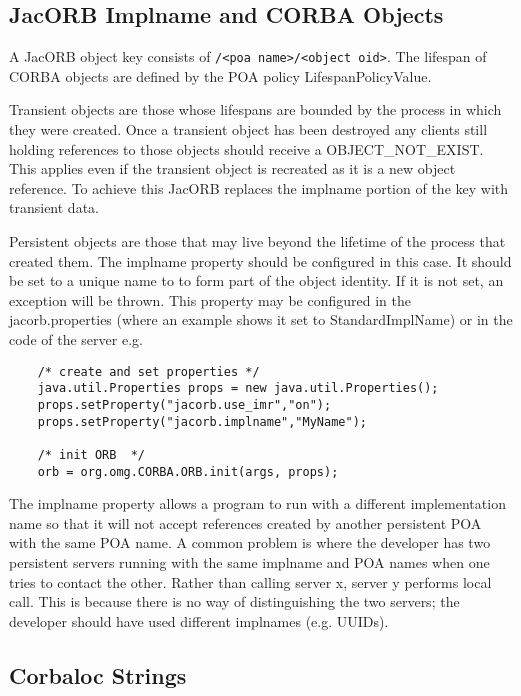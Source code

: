 {{\subsection{JacORB Implname and CORBA Objects}
\label{implname}
A JacORB object key consists of {\tt <impl name>/<poa name>/<object oid>}. The lifespan of CORBA objects are defined by the POA policy LifespanPolicyValue.

Transient objects are those whose lifespans are bounded by the process in which they were created. Once a transient object has been destroyed any clients still holding references to those objects should receive a OBJECT\_NOT\_EXIST. This applies even if the transient object is recreated as it is a new object reference. To achieve this JacORB replaces the implname portion of the key with transient data.

Persistent objects are those that may live beyond the lifetime of the process that created them. The implname property should be configured in this case. It should be set to a unique name to to form part of the object identity. If it is not set, an exception will be thrown. This property may be configured in the jacorb.properties (where an example shows it set to StandardImplName) or in the code of the server e.g.
\small{
\begin{verbatim}
    /* create and set properties */
    java.util.Properties props = new java.util.Properties();
    props.setProperty("jacorb.use_imr","on");
    props.setProperty("jacorb.implname","MyName");

    /* init ORB  */
    orb = org.omg.CORBA.ORB.init(args, props);
\end{verbatim}
}

The implname property allows a program to run with a different implementation name so that it will not accept references created by another persistent POA with the same POA name. A common problem is where the developer has two persistent servers running with the same implname and POA names when one tries to contact the other. Rather than calling server x, server y performs local call. This is because there is no way of distinguishing the two servers; the developer should have used different implnames (e.g. UUIDs).

\subsection{Corbaloc Strings}

}}
